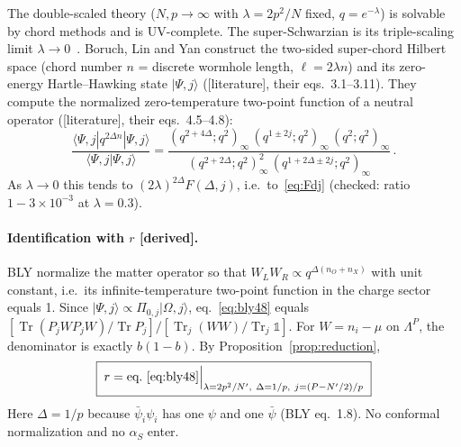 \documentclass[11pt]{article}
\newcommand{\Tr}{\operatorname{Tr}}
\newcommand{\ket}[1]{\lvert #1\rangle}
\newcommand{\Np}{N'}
\newcommand{\tagbox}[2]{\textsf{\small\color{#1}[#2]}}
\newcommand{\EST}{\tagbox{cest}{literature}}
\newcommand{\DER}{\tagbox{cder}{derived}}
\theoremstyle{remark}
\begin{document}
The double-scaled theory ($N,p\to\infty$ with $\lambda=2p^2/N$ fixed, $q=e^{-\lambda}$) is solvable by chord methods and
is UV-complete. The super-Schwarzian is its triple-scaling limit $\lambda\to0$~\cite{BLY}. Boruch, Lin and Yan
construct the two-sided super-chord Hilbert space (chord number $n$ = discrete wormhole length, $\ell=2\lambda n$) and
its zero-energy Hartle--Hawking state $\ket{\Psi,j}$ (\EST, their eqs.~3.1--3.11). They compute the normalized
zero-temperature two-point function of a neutral operator (\EST, their eqs.~4.5--4.8):
\begin{equation}
\frac{\langle\Psi,j|q^{2\Delta n}|\Psi,j\rangle}{\langle\Psi,j|\Psi,j\rangle}
=\frac{(q^{2+4\Delta};q^2)_\infty\,(q^{1\pm2j};q^2)_\infty\,(q^2;q^2)_\infty}{(q^{2+2\Delta};q^2)_\infty^2\,(q^{1+2\Delta\pm2j};q^2)_\infty}\,.
\label{eq:bly48}
\end{equation}
As $\lambda\to0$ this tends to $(2\lambda)^{2\Delta}F(\Delta,j)$, i.e.\ to~\eqref{eq:Fdj} (checked: ratio $1-3\times10^{-3}$ at
$\lambda=0.3$).

\paragraph{Identification with $r$ \DER.} BLY normalize the matter operator so that $W_LW_R\propto q^{\Delta(n_O+n_X)}$ with
unit constant, i.e.\ its infinite-temperature two-point function in the charge sector equals 1. Since
$\ket{\Psi,j}\propto\Pi_{0,j}\ket{\Omega,j}$, eq.~\eqref{eq:bly48} equals
$[\Tr(P_jWP_jW)/\Tr P_j]/[\Tr_j(WW)/\Tr_j\mathbb 1]$. For $W=n_i-\mu$ on $\Lambda^P$, the denominator is exactly
$b(1-b)$. By Proposition~\ref{prop:reduction},
\begin{equation}
\boxed{\;r=\text{eq.~\eqref{eq:bly48}}\Big|_{\lambda=2p^2/\Np,\ \Delta=1/p,\ j=(P-\Np/2)/p}\;}
\label{eq:rchord}
\end{equation}
Here $\Delta=1/p$ because $\bar\psi_i\psi_i$ has one $\psi$ and one $\bar\psi$ (BLY eq.~1.8). No conformal
normalization and no $\alpha_S$ enter.
\end{document}
